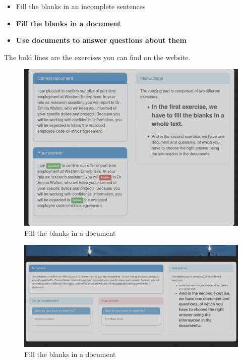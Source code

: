 \documentclass[12pt,a4paper]{report}
\begin{document}
\begin{itemize}
\item Fill the blanks in an incomplete sentences
\item \textbf{Fill the blanks in a document}
\item \textbf{Use documents to answer questions about them}
\end{itemize}

The bold lines are the exercises you can find on the website.

\begin{figure}[here]
\includegraphics[scale=0.45]{rex1end.png}
\caption{Fill the blanks in a document}
\label{reading.ex1.end}
\end{figure}



\begin{figure}[here]
\includegraphics[scale=0.4]{rex2end.png}
\caption{Fill the blanks in a document}
\label{reading.ex2.end}
\end{figure}
\end{document}
